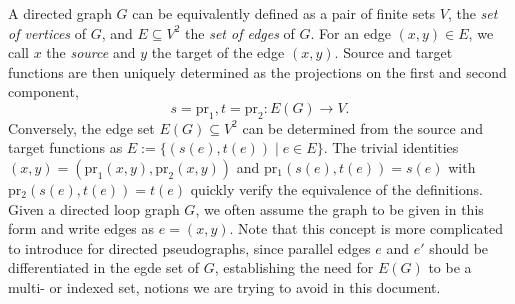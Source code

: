 









\begin{remark}  
  A directed graph $G$ can be equivalently defined
   as a pair
  of finite sets $V$, the \textit{set of vertices} of $G$, and $E
  \subseteq V^2$ the \textit{set of edges} of $G$.  For an edge $(x,y)
  \in E$, we call $x$ the \textit{source} and $y$ the target of the
  edge $(x,y)$. Source and target functions are then uniquely
  determined as the projections on the first and second component, 
  \[s = \mathrm{pr}_1, t = \mathrm{pr}_2: E(G) \to V.\] Conversely,
  the edge set $E(G) \subseteq V^2$ can be determined from the source
  and target functions as $E:=\{(s(e),t(e)) \mid e \in E\}$. The
  trivial identities $(x,y) = (\mathrm{pr}_1(x,y),\mathrm{pr}_2(x,y))$
  and $\mathrm{pr_1}(s(e), t(e)) = s(e)$ with $\mathrm{pr_2}(s(e),
  t(e)) = t(e)$ quickly verify the equivalence of the definitions.
  Given a directed loop graph $G$, we often assume the graph to be
  given in this form and write edges as $e=(x,y)$. Note that this
  concept is more complicated to introduce for directed pseudographs,
  since parallel edges $e$ and $e'$ should be differentiated in the
  egde set of $G$, establishing the need for $E(G)$ to be a multi- or
  indexed set, notions we are trying to avoid in this document.
\end{remark}



